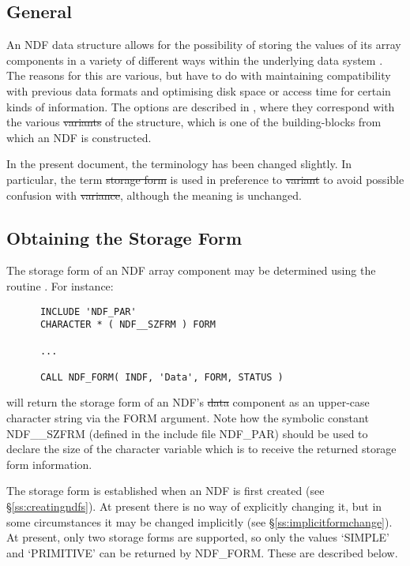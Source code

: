 \subsection{General}

An NDF data structure allows for the possibility of storing the values of 
its array components in a variety of different ways within the underlying 
data system .
The reasons for this are various, but have to do with maintaining
compatibility with previous data formats and optimising disk space or access
time for certain kinds of information.
The options are described in , where they
correspond with the various
\st{variants\/} of the  structure, which is one
of the building-blocks from which an NDF is constructed. 

In the present document, the terminology has been changed slightly.
In particular, the term \st{storage form\/} is used in preference to
\st{variant\/} to avoid possible confusion with \st{variance},
although the  
meaning is unchanged.

\subsection{Obtaining the Storage Form}

The storage form of an NDF array component may be determined using the 
routine .
For instance:

\small
\begin{verbatim}
      INCLUDE 'NDF_PAR'
      CHARACTER * ( NDF__SZFRM ) FORM

      ...

      CALL NDF_FORM( INDF, 'Data', FORM, STATUS )
\end{verbatim}
\normalsize

will return the storage form of an NDF's \st{data\/} component as an
upper-case character string via the FORM argument.
Note how the symbolic constant NDF\_\_SZFRM (defined in the include file 
NDF\_PAR) should be used to declare the size of the character variable which 
is to receive the returned storage form information.

The storage form is established when an NDF is first created (see
\S\ref{ss:creatingndfs}).
At present there is no way of explicitly changing it, but in some
circumstances it may be changed implicitly (see
\S\ref{ss:implicitformchange}). 
At present, only two storage forms are supported, so only the values
`SIMPLE' and `PRIMITIVE' can be returned by NDF\_FORM. 
These are described below.

